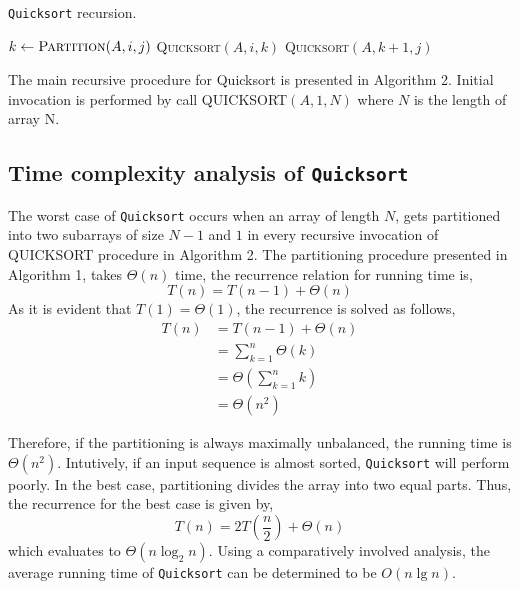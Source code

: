 \documentclass[a4paper, 10pt,twocolumn]{article}
\begin{document}
\begin{algorithm}
	\caption{\texttt{Quicksort} recursion.}
	\label{algo:quick_sort2}
	\begin{algorithmic}[1]
		\newline
     			\State $k \leftarrow \textsc{Partition}(A,i,j)$
     			\State \textsc{Quicksort}$(A,i,k)$
     			\State \textsc{Quicksort}$(A,k+1,j)$ 	
          	\EndIf
     	\EndProcedure 
  	\end{algorithmic}
\end{algorithm}
\par
The main recursive procedure for Quicksort is presented in Algorithm 2. Initial invocation is performed by call QUICKSORT$(A, 1, N )$ where $N$ is the length of array N.

\subsection{Time complexity analysis of \texttt{Quicksort}}
The worst case of \texttt{Quicksort} occurs when an array of length $N$, gets partitioned into two subarrays of size $N-1$ and $1$ in every recursive invocation of QUICKSORT procedure in Algorithm 2. The partitioning procedure presented in Algorithm 1, takes $\Theta(n)$ time, the recurrence relation for running time is,
\begin{equation*}
T(n) = T(n-1) + \Theta(n)
\end{equation*}
As it is evident that $T(1) = \Theta(1)$, the recurrence is solved as follows,
\begin{align*}
T(n) &= T(n-1) + \Theta(n)\\
&= \sum_{k=1}^{n}\Theta(k)\\
&= \Theta\left( \sum_{k=1}^{n}k \right)\\
&= \Theta(n^2)
\end{align*}
\par
Therefore, if the partitioning is always maximally unbalanced, the running time is $\Theta(n^2)$. Intutively, if an input sequence is almost sorted, \texttt{Quicksort} will perform poorly. In the best case, partitioning divides the array into two equal parts. Thus, the recurrence for the best case is given by,
\begin{equation*}
T(n) = 2T\left(\frac{n}{2}\right) + \Theta(n)
\end{equation*}
which evaluates to $\Theta(n \log_2 n)$. Using a comparatively involved analysis, the average running time of \texttt{Quicksort} can be determined to be $O(n \lg n)$.
\end{document}
